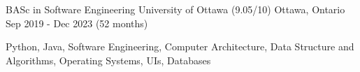 \begin{cventries}
	\cventry
	{BASc in Software Engineering}
	{University of Ottawa (9.05/10)}
	{Ottawa, Ontario}
	{Sep 2019 - Dec 2023 (52 months)}
	{
		\begin{cvitems}
			\item{Python, Java, Software Engineering, Computer Architecture, Data Structure and Algorithms, Operating Systems, UIs, Databases}
		\end{cvitems}
	}
\end{cventries}
